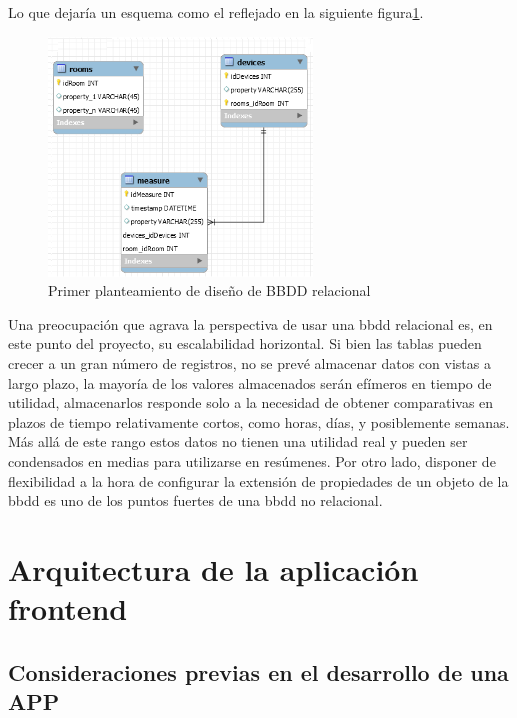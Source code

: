 Lo que dejaría un esquema como el reflejado en la siguiente figura\ref{sqlschema3}.

\begin{figure}[hbt!]
\centering
\label{sqlschema3}
\includegraphics[height=2.5in]{figures/SQLSchemaExample_3.png}
\caption[Tercer planteamiento de diseño de BBDD relacional]{Primer planteamiento de diseño de BBDD relacional\footnotemark}
\end{figure}

\vspace{1cm}

Una preocupación que agrava la perspectiva de usar una \gls{bbdd} relacional es, en este punto del proyecto, su escalabilidad horizontal. Si bien las tablas pueden crecer a un gran número de registros, no se prevé almacenar datos con vistas a largo plazo, la mayoría de los valores almacenados serán efímeros en tiempo de utilidad, almacenarlos responde solo a la necesidad de obtener comparativas en plazos de tiempo relativamente cortos, como horas, días, y posiblemente semanas. Más allá de este rango estos datos no tienen una utilidad real y pueden ser condensados en medias para utilizarse en resúmenes. Por otro lado, disponer de flexibilidad a la hora de configurar la extensión de propiedades de un objeto de la \gls{bbdd} es uno de los puntos fuertes de una \gls{bbdd} no relacional.


\section{Arquitectura de la aplicación frontend}
\label{ch:Capitulo4.5}

\subsection{Consideraciones previas en el desarrollo de una APP}
\label{c:Capitulo4.5.1}

